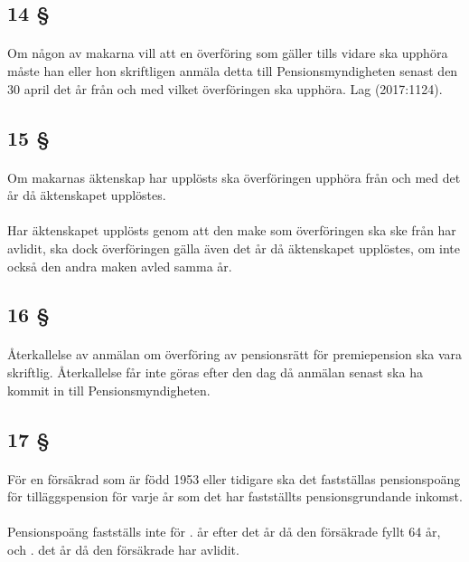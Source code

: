 \documentclass[a4paper,notitlepage,openany,10pt]{book}
\begin{document}
\subsection*{14 §}
\paragraph*{}
Om någon av makarna vill att en överföring som gäller tills vidare ska upphöra måste han eller hon skriftligen anmäla detta till Pensionsmyndigheten senast den 30 april det år från och med vilket överföringen ska upphöra.
Lag (2017:1124).
\subsection*{15 §}
\paragraph*{}
Om makarnas äktenskap har upplösts ska överföringen upphöra från och med det år då äktenskapet upplöstes.
\paragraph*{}
Har äktenskapet upplösts genom att den make som överföringen ska ske från har avlidit, ska dock överföringen gälla även det år då äktenskapet upplöstes, om inte också den andra maken avled samma år.
\subsection*{16 §}
\paragraph*{}
Återkallelse av anmälan om överföring av pensionsrätt för premiepension ska vara skriftlig. Återkallelse får inte göras efter den dag då anmälan senast ska ha kommit in till Pensionsmyndigheten.
\subsection*{17 §}
\paragraph*{}
För en försäkrad som är född 1953 eller tidigare ska det fastställas pensionspoäng för tilläggspension för varje år som det har fastställts pensionsgrundande inkomst.
\paragraph*{}
Pensionspoäng fastställs inte för
. år efter det år då den försäkrade fyllt 64 år, och
. det år då den försäkrade har avlidit.
\end{document}
